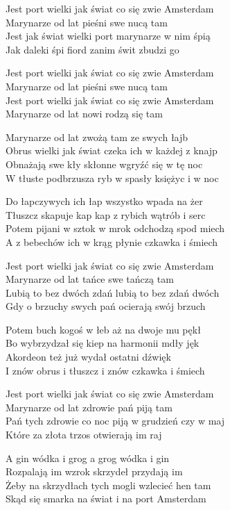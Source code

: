 \begin{text}
    Jest port wielki jak świat co się zwie Amsterdam\\
    Marynarze od lat pieśni swe nucą tam\\
    Jest jak świat wielki port marynarze w nim śpią\\
    Jak daleki śpi fiord zanim świt zbudzi go

    Jest port wielki jak świat co się zwie Amsterdam\\
    Marynarze od lat pieśni swe nucą tam\\
    Jest port wielki jak świat co się zwie Amsterdam\\
    Marynarze od lat nowi rodzą się tam

    Marynarze od lat zwożą tam ze swych łajb\\
    Obrus wielki jak świat czeka ich w każdej z knajp\\
    Obnażają swe kły skłonne wgryźć się w tę noc\\
    W tłuste podbrzusza ryb w spasły księżyc i w noc

    Do łapczywych ich łap wszystko wpada na żer\\
    Tłuszcz skapuje kap kap z rybich wątrób i serc\\
    Potem pijani w sztok w mrok odchodzą spod miech\\
    A z bebechów ich w krąg płynie czkawka i śmiech

    Jest port wielki jak świat co się zwie Amsterdam\\
    Marynarze od lat tańce swe tańczą tam\\
    Lubią to bez dwóch zdań lubią to bez zdań dwóch\\
    Gdy o brzuchy swych pań ocierają swój brzuch

    Potem buch kogoś w łeb aż na dwoje mu pękł\\
    Bo wybrzydzał się kiep na harmonii mdły jęk\\
    Akordeon też już wydał ostatni dźwięk\\
    I znów obrus i tłuszcz i znów czkawka i śmiech

    Jest port wielki jak świat co się zwie Amsterdam\\
    Marynarze od lat zdrowie pań piją tam\\
    Pań tych zdrowie co noc piją w grudzień czy w maj\\
    Które za złota trzos otwierają im raj

    A gin wódka i grog a grog wódka i gin\\
    Rozpalają im wzrok skrzydeł przydają im\\
    Żeby na skrzydłach tych mogli wzlecieć hen tam\\
    Skąd się smarka na świat i na port Amsterdam
\end{text}
